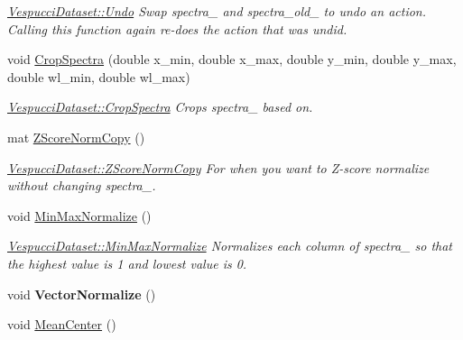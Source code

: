 \begin{DoxyCompactItemize}
\begin{DoxyCompactList}\small\item\em \hyperlink{class_vespucci_dataset_aff9e3befb759a5a8f54a703434203fb1}{Vespucci\+Dataset\+::\+Undo} Swap spectra\+\_\+ and spectra\+\_\+old\+\_\+ to undo an action. Calling this function again re-\/does the action that was undid. \end{DoxyCompactList}\item 
void \hyperlink{class_vespucci_dataset_aa0706b058354cddc5e1fbba68721aa87}{Crop\+Spectra} (double x\+\_\+min, double x\+\_\+max, double y\+\_\+min, double y\+\_\+max, double wl\+\_\+min, double wl\+\_\+max)
\begin{DoxyCompactList}\small\item\em \hyperlink{class_vespucci_dataset_aa0706b058354cddc5e1fbba68721aa87}{Vespucci\+Dataset\+::\+Crop\+Spectra} Crops spectra\+\_\+ based on. \end{DoxyCompactList}\item 
mat \hyperlink{class_vespucci_dataset_a31ef7d438e00a7e1163fc09074e17f97}{Z\+Score\+Norm\+Copy} ()
\begin{DoxyCompactList}\small\item\em \hyperlink{class_vespucci_dataset_a31ef7d438e00a7e1163fc09074e17f97}{Vespucci\+Dataset\+::\+Z\+Score\+Norm\+Copy} For when you want to Z-\/score normalize without changing spectra\+\_\+. \end{DoxyCompactList}\item 
void \hyperlink{class_vespucci_dataset_ae6b3fa7cce13ee7f3ad7b93131ac0370}{Min\+Max\+Normalize} ()\hypertarget{class_vespucci_dataset_ae6b3fa7cce13ee7f3ad7b93131ac0370}{}\label{class_vespucci_dataset_ae6b3fa7cce13ee7f3ad7b93131ac0370}

\begin{DoxyCompactList}\small\item\em \hyperlink{class_vespucci_dataset_ae6b3fa7cce13ee7f3ad7b93131ac0370}{Vespucci\+Dataset\+::\+Min\+Max\+Normalize} Normalizes each column of spectra\+\_\+ so that the highest value is 1 and lowest value is 0. \end{DoxyCompactList}\item 
void {\bfseries Vector\+Normalize} ()\hypertarget{class_vespucci_dataset_a07bfc70e12573e809b5ea1707cba35ae}{}\label{class_vespucci_dataset_a07bfc70e12573e809b5ea1707cba35ae}

\item 
void \hyperlink{class_vespucci_dataset_af60babe573316c3e65fe1efa5be88964}{Mean\+Center} ()\hypertarget{class_vespucci_dataset_af60babe573316c3e65fe1efa5be88964}{}\label{class_vespucci_dataset_af60babe573316c3e65fe1efa5be88964}


\end{DoxyCompactItemize}
